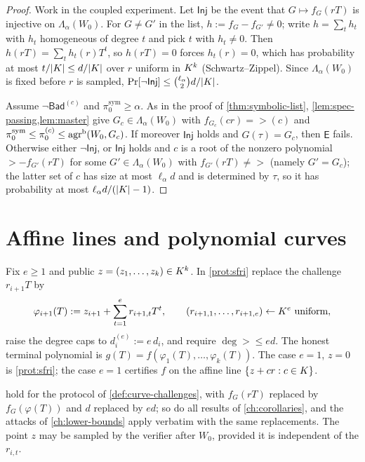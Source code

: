 \begin{proof}
Work in the coupled experiment. Let $\mathsf{Inj}$ be the event that
$G\mapsto f_G(rT)$ is injective on $\Lambda_\alpha(W_0)$. For $G\ne G'$ in the list,
$h:=f_G-f_{G'}\ne0$; write $h=\sum_th_t$ with $h_t$ homogeneous of degree $t$ and pick $t$
with $h_t\ne0$. Then $h(rT)=\sum_th_t(r)T^t$, so $h(rT)=0$ forces $h_t(r)=0$, which has
probability at most $t/|K|\le d/|K|$ over $r$ uniform in $K^k$ (Schwartz--Zippel). Since
$\Lambda_\alpha(W_0)$ is fixed before $r$ is sampled,
$\Pr[\neg\mathsf{Inj}]\le\binom{\ell_\alpha}2d/|K|$.

Assume $\neg\mathsf{Bad}^{(c)}$ and $\pi^{\mathrm{sym}}_0\ge\alpha$. As in the proof of
\cref{thm:symbolic-list}, \cref{lem:spec-passing,lem:master} give
$G_c\in\Lambda_\alpha(W_0)$ with $f_{G_c}(cr)=\gt(c)$ and
$\pi^{\mathrm{sym}}_0\le\pi^{(c)}_0\le\mathrm{agr}^{\mathrm{b}}(W_0,G_c)$. If moreover $\mathsf{Inj}$ holds
and $G(\tau)=G_c$, then $\mathsf E$ fails. Otherwise either $\neg\mathsf{Inj}$, or
$\mathsf{Inj}$ holds and $c$ is a root of the nonzero polynomial $\gt-f_{G'}(rT)$ for some
$G'\in\Lambda_\alpha(W_0)$ with $f_{G'}(rT)\ne\gt$ (namely $G'=G_c$); the latter set of
$c$ has size at most $\ell_\alpha d$ and is determined by $\tau$, so it has probability at
most $\ell_\alpha d/(|K|-1)$.
\end{proof}

\section{Affine lines and polynomial curves}\label{sec:curves}

\begin{definition}\label{def:curve-challenges}
Fix $e\ge1$ and public $z=(z_1,\dots,z_k)\in K^k$. In \cref{prot:sfri} replace the
challenge $r_{i+1}T$ by
\[
\varphi_{i+1}(T):=z_{i+1}+\sum_{t=1}^{e}r_{i+1,t}T^t,\qquad
(r_{i+1,1},\dots,r_{i+1,e})\leftarrow K^e\ \text{uniform},
\]
raise the degree caps to $d_i^{(e)}:=e\,d_i$, and require $\deg\gt\le ed$. The honest
terminal polynomial is $g(T)=f(\varphi_1(T),\dots,\varphi_k(T))$. The case $e=1$, $z=0$ is
\cref{prot:sfri}; the case $e=1$ certifies $f$ on the affine line
$\{z+cr:c\in K\}$.
\end{definition}

\begin{proposition}\label{prop:curves}
 hold for the protocol of
\cref{def:curve-challenges}, with $f_G(rT)$ replaced by $f_G(\varphi(T))$ and $d$ replaced
by $ed$; so do all results of \cref{ch:corollaries}, and the attacks of
\cref{ch:lower-bounds} apply verbatim with the same replacements. The point $z$ may be
sampled by the verifier after $W_0$, provided it is independent of the $r_{i,t}$.
\end{proposition}

